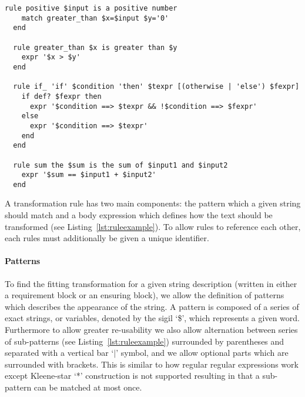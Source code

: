 \begin{lstlisting}[caption={Different Types of Transformation Rules in Lettuce},label={lst:ruleexample}]
  rule positive $input is a positive number
    match greater_than $x=$input $y='0'
  end

  rule greater_than $x is greater than $y
    expr '$x > $y'
  end

  rule if_ 'if' $condition 'then' $texpr [(otherwise | 'else') $fexpr]
    if def? $fexpr then
      expr '$condition ==> $texpr && !$condition ==> $fexpr'
    else
      expr '$condition ==> $texpr'
    end
  end

  rule sum the $sum is the sum of $input1 and $input2
    expr '$sum == $input1 + $input2'
  end
\end{lstlisting}

A transformation rule has two main components: the pattern which a given
string should match and a body expression which defines how the
text should be transformed (see Listing~\ref{lst:ruleexample}).
To allow rules to reference each other, each rules must additionally be
given a unique identifier.

\paragraph{Patterns}
\label{par:Patterns}

To find the fitting transformation for a given string description
(written in either a requirement block or an ensuring block), we allow the
definition of patterns which describes the appearance of the string.
A pattern is composed of a series of exact strings, or variables,
denoted by the sigil `\$', which represents a given word.
Furthermore to allow greater re-usability we also allow alternation between
series of sub-patterns (see Listing~\ref{lst:ruleexample}) surrounded by parentheses and
separated with a vertical bar `$\vert$' symbol, and we allow optional parts which are
surrounded with brackets.  This is similar to how regular regular
expressions work except Kleene-star `*' construction is not supported
resulting in that a sub-pattern can be matched at most once.

